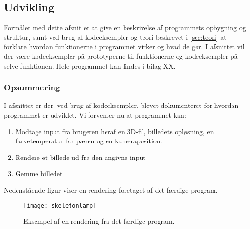 \subsection{Udvikling}
Formålet med dette afsnit er at give en beskrivelse af programmets opbygning og struktur, samt ved brug af kodeeksempler og teori beskrevet i \ref{sec:teori} at forklare hvordan funktionerne i programmet virker og hvad de gør. I afsnittet vil der være kodeeksempler på prototyperne til funktionerne og kodeeksempler på selve funktionen. Hele programmet kan findes i bilag XX.







\subsubsection*{Opsummering}

I afsnittet er der, ved brug af kodeeksempler, blevet dokumenteret for hvordan programmet er udviklet. Vi forventer nu at programmet kan:

\begin{enumerate}
    \item Modtage input fra brugeren heraf en 3D-fil, billedets opløsning, en farvetemperatur for pæren og en kameraposition.
    \item Rendere et billede ud fra den angivne input
    \item Gemme billedet
\end{enumerate}

Nedenstående figur viser en rendering foretaget af det færdige program. 

\begin{figure}[H]
    \centering
    \texttt{[image: skeletonlamp]}
    \caption{Eksempel af en rendering fra det færdige program.}
\end{figure}
